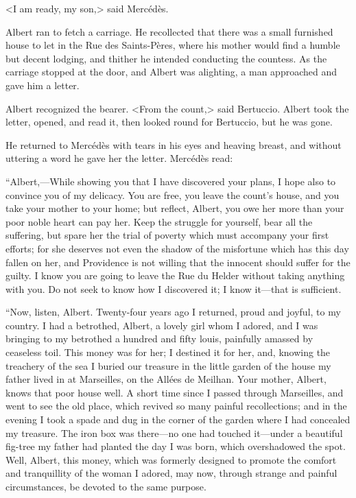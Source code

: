  <I am ready, my son,> said Mercédès. 

 Albert ran to fetch a carriage. He recollected that there was a small furnished house to let in the Rue des Saints-Pères, where his mother would find a humble but decent lodging, and thither he intended conducting the countess. As the carriage stopped at the door, and Albert was alighting, a man approached and gave him a letter. 

 Albert recognized the bearer. <From the count,> said Bertuccio. Albert took the letter, opened, and read it, then looked round for Bertuccio, but he was gone. 

 He returned to Mercédès with tears in his eyes and heaving breast, and without uttering a word he gave her the letter. Mercédès read: 

 “Albert,—While showing you that I have discovered your plans, I hope also to convince you of my delicacy. You are free, you leave the count's house, and you take your mother to your home; but reflect, Albert, you owe her more than your poor noble heart can pay her. Keep the struggle for yourself, bear all the suffering, but spare her the trial of poverty which must accompany your first efforts; for she deserves not even the shadow of the misfortune which has this day fallen on her, and Providence is not willing that the innocent should suffer for the guilty. I know you are going to leave the Rue du Helder without taking anything with you. Do not seek to know how I discovered it; I know it—that is sufficient. 

 “Now, listen, Albert. Twenty-four years ago I returned, proud and joyful, to my country. I had a betrothed, Albert, a lovely girl whom I adored, and I was bringing to my betrothed a hundred and fifty louis, painfully amassed by ceaseless toil. This money was for her; I destined it for her, and, knowing the treachery of the sea I buried our treasure in the little garden of the house my father lived in at Marseilles, on the Allées de Meilhan. Your mother, Albert, knows that poor house well. A short time since I passed through Marseilles, and went to see the old place, which revived so many painful recollections; and in the evening I took a spade and dug in the corner of the garden where I had concealed my treasure. The iron box was there—no one had touched it—under a beautiful fig-tree my father had planted the day I was born, which overshadowed the spot. Well, Albert, this money, which was formerly designed to promote the comfort and tranquillity of the woman I adored, may now, through strange and painful circumstances, be devoted to the same purpose. 

